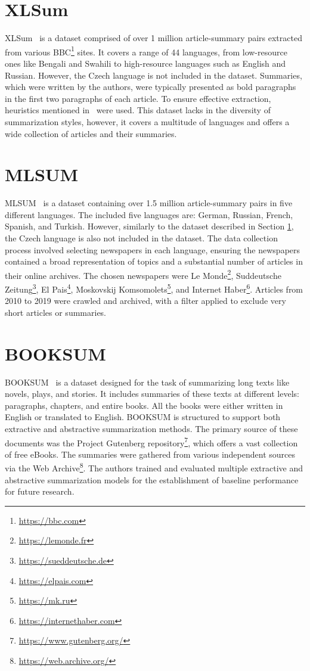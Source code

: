 \documentclass[english, ba, kiv, he, iso690numb, pdf, viewonly]{fasthesis}
\begin{document}
\section{XLSum} \label{xlsum}
XLSum~\cite{hasan-etal-2021-xl} is a dataset comprised of over 1 million article-summary pairs extracted from various BBC\footnote{\url{https://bbc.com}} sites. It covers a range of 44 languages, from low-resource ones like Bengali and Swahili to high-resource languages such as English and Russian. However, the Czech language is not included in the dataset. Summaries, which were written by the authors, were typically presented as bold paragraphs in the first two paragraphs of each article. To ensure effective extraction, heuristics mentioned in~\cite{hasan-etal-2021-xl} were used. This dataset lacks in the diversity of summarization styles, however, it covers a multitude of languages and offers a wide collection of articles and their summaries.

\section{MLSUM}
MLSUM~\cite{scialom2020mlsum} is a dataset containing over 1.5 million article-summary pairs in five different languages. The included five languages are: German, Russian, French, Spanish, and Turkish. However, similarly to the dataset described in Section \ref{xlsum}, the Czech language is also not included in the dataset. The data collection process involved selecting newspapers in each language, ensuring the newspapers contained a broad representation of topics and a substantial number of articles in their online archives. The chosen newspapers were Le Monde\footnote{\url{https://lemonde.fr}}, Suddeutsche Zeitung\footnote{\url{https://sueddeutsche.de}}, El Pais\footnote{\url{https://elpais.com}}, Moskovskij Komsomolets\footnote{\url{https://mk.ru}}, and Internet Haber\footnote{\url{https://internethaber.com}}. Articles from 2010 to 2019 were crawled and archived, with a filter applied to exclude very short articles or summaries.

\section{BOOKSUM}
BOOKSUM~\cite{kryscinski2021booksum} is a dataset designed for the task of summarizing long texts like novels, plays, and stories. It includes summaries of these texts at different levels: paragraphs, chapters, and entire books. All the books were either written in English or translated to English. BOOKSUM is structured to support both extractive and abstractive summarization methods. The primary source of these documents was the Project Gutenberg repository\footnote{\url{https://www.gutenberg.org/}}, which offers a vast collection of free eBooks. The summaries were gathered from various independent sources via the Web Archive\footnote{\url{https://web.archive.org/}}. The authors trained and evaluated multiple extractive and abstractive summarization models for the establishment of baseline performance for future research.
\end{document}
